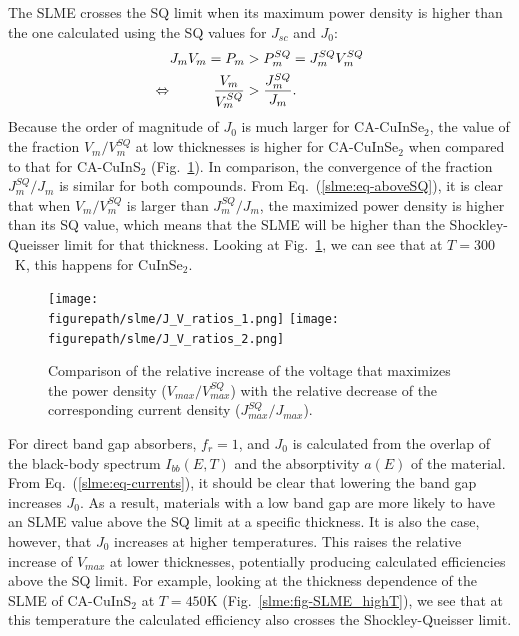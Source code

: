 \begin{refsection}
The SLME crosses the SQ limit when its maximum power density is higher than 
the one calculated using the SQ values for $J_{sc}$ and $J_0$: 
\begin{equation} \label{slme:eq-aboveSQ} 
\begin{aligned} 
J_m V_m = P_m &> P_m^{SQ} = J_m^{SQ} V_m^{SQ} \\ 
\Leftrightarrow \hspace{0.4in}\frac{V_m}{V_m^{SQ}} &> \frac{J_m^{SQ}}{J_m}. 
\end{aligned} 
\end{equation} 
Because the order of magnitude of $J_0$ is much larger for 
\mbox{CA-CuInSe$_2$}, the value of the fraction $V_m/V_m^{SQ}$ at low 
thicknesses is higher for \mbox{CA-CuInSe$_2$} when compared to that for 
\mbox{CA-CuInS$_2$} (Fig.~\ref{slme:fig-VJcomp}). In comparison, the 
convergence of the fraction $J_m^{SQ}/J_m$ is similar for both compounds. From 
Eq.~(\ref{slme:eq-aboveSQ}), it is clear that when $V_m/V_m^{SQ}$ is larger 
than $J_m^{SQ}/J_m$, the maximized power density is higher than its SQ value, 
which means that the SLME will be higher than the Shockley-Queisser limit for 
that thickness. Looking at Fig.~\ref{slme:fig-VJcomp}, we can see that at 
$T=300$~\si{\kelvin}, this happens for CuInSe$_2$. 
 
\begin{figure}[ht] 
\centering 
\texttt{[image: \\figurepath/slme/J\_V\_ratios\_1.png]} 
\texttt{[image: \\figurepath/slme/J\_V\_ratios\_2.png]} 
\caption{Comparison of the relative increase of the voltage that maximizes 
the power density ($V_{max}/V_{max}^{SQ}$) with the relative decrease of the 
corresponding current density ($J_{max}^{SQ}/J_{max}$).} 
\label{slme:fig-VJcomp} 
\end{figure} 
 
For direct band gap absorbers, $f_r = 1$, and $J_0$ is calculated from the 
overlap of the black-body spectrum $I_{bb}(E,T)$ and the absorptivity $a(E)$ 
of the material. From Eq.~(\ref{slme:eq-currents}), it should be clear that 
lowering the band gap increases $J_0$. As a result, materials with a low band 
gap are more likely to have an SLME value above the SQ limit at a specific 
thickness. It is also the case, however, that $J_0$ increases at higher 
temperatures. This raises the relative increase of $V_{max}$ at lower 
thicknesses, potentially producing calculated efficiencies above the SQ limit. 
For example, looking at the thickness dependence of the SLME of CA-CuInS$_2$ 
at $T=450\si{\kelvin}$ (Fig.~\ref{slme:fig-SLME_highT}), we see that at this 
temperature the calculated efficiency also crosses the Shockley-Queisser 
limit.  
 

\end{refsection}
